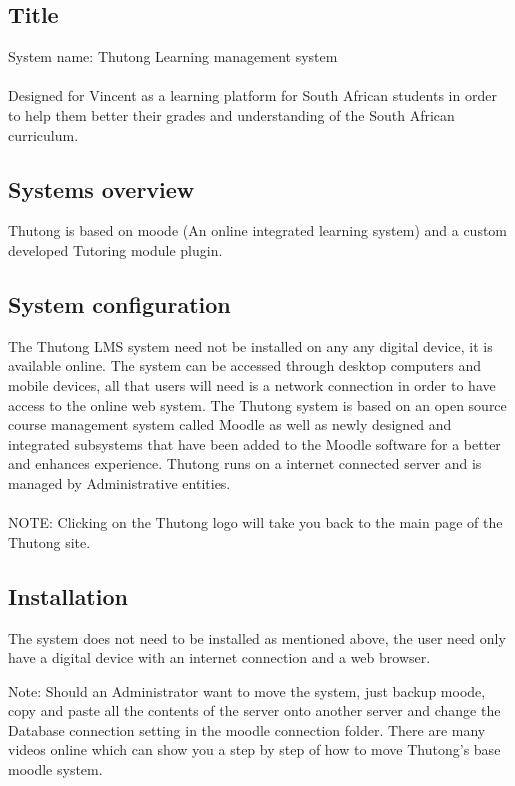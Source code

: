 \documentclass[english]{article}
\begin{document}
\subsection{Title}
System name: Thutong Learning management system\\\\
Designed for Vincent as a learning platform for South African students in order to help them better their grades and understanding of the South African curriculum.

\subsection{Systems overview}
Thutong is based on moode (An online integrated learning system) and a custom developed Tutoring module plugin.

	\subsection{System configuration}
The Thutong LMS system need not be installed on any any digital device, it is available online. The system can be accessed through desktop computers and mobile devices, all that users will need is a network connection in order to have access to the online web system. The Thutong system is based on an open source course management system called Moodle as well as newly designed and integrated subsystems that have been added to the Moodle software for a better and enhances experience. Thutong runs on a internet connected server and is managed by Administrative entities.\\\\
NOTE: Clicking on the Thutong logo will take you back to the main page of the Thutong site.
	
	\subsection{Installation}
The system does not need to be installed as mentioned above, the user need only have a digital device with an internet connection and a web browser.

Note: Should an Administrator want to move the system, just backup moode, copy and paste all the contents of the server onto another server and change the Database connection setting in the moodle connection folder. There are many videos online which can show you a step by step of how to move Thutong's base moodle system.
\end{document}

